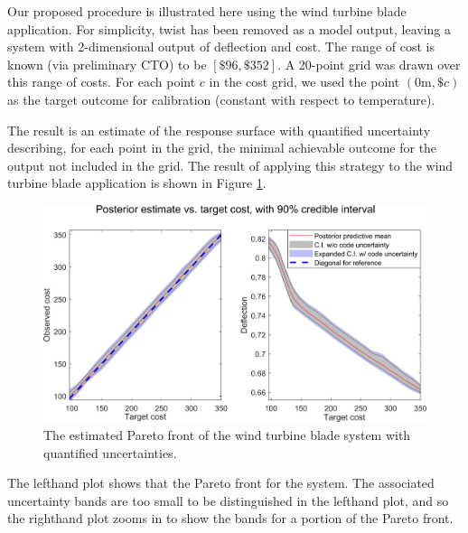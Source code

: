 \documentclass[12pt]{article}
\begin{document}
%
Our proposed procedure is illustrated here using the wind turbine blade application.
%
For simplicity, twist has been removed as a model output, leaving a system with 2-dimensional output of deflection and cost. 
%
The range of cost is known (via preliminary CTO) to be $[\$96,\$352]$.
%
A 20-point grid was drawn over this range of costs. 
%
%
For each point $c$ in the cost grid, we used the point $(0\mathrm m,\$c)$ as the target outcome for calibration (constant with respect to temperature).
%

%
The result is an estimate of the response surface with quantified uncertainty describing, for each point in the grid, the minimal achievable outcome for the output not included in the grid.
%
%
%
The result of applying this strategy to the wind turbine blade application is shown in Figure \ref{fig:known_cost}. 
%
\begin{figure}[h]
\centering
\includegraphics[scale=.8]{FIG_cost_grid_pareto_bands}
\caption{The estimated Pareto front of the wind turbine blade system with quantified uncertainties.}
\label{fig:known_cost}
\end{figure}
%
The lefthand plot shows that the Pareto front for the system.
%
The associated uncertainty bands are too small to be distinguished in the lefthand plot, and so the righthand plot zooms in to show the bands for a portion of the Pareto front.
%
%
%
\end{document}
